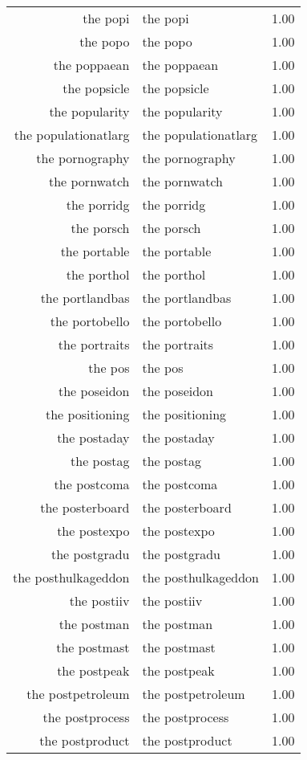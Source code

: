 \begin{table}[ht]
\begin{tabular}{rlr}
  the popi & the popi & 1.00 \\ 
  the popo & the popo & 1.00 \\ 
  the poppaean & the poppaean & 1.00 \\ 
  the popsicle & the popsicle & 1.00 \\ 
  the popularity & the popularity & 1.00 \\ 
  the populationatlarg & the populationatlarg & 1.00 \\ 
  the pornography & the pornography & 1.00 \\ 
  the pornwatch & the pornwatch & 1.00 \\ 
  the porridg & the porridg & 1.00 \\ 
  the porsch & the porsch & 1.00 \\ 
  the portable & the portable & 1.00 \\ 
  the porthol & the porthol & 1.00 \\ 
  the portlandbas & the portlandbas & 1.00 \\ 
  the portobello & the portobello & 1.00 \\ 
  the portraits & the portraits & 1.00 \\ 
  the pos & the pos & 1.00 \\ 
  the poseidon & the poseidon & 1.00 \\ 
  the positioning & the positioning & 1.00 \\ 
  the postaday & the postaday & 1.00 \\ 
  the postag & the postag & 1.00 \\ 
  the postcoma & the postcoma & 1.00 \\ 
  the posterboard & the posterboard & 1.00 \\ 
  the postexpo & the postexpo & 1.00 \\ 
  the postgradu & the postgradu & 1.00 \\ 
  the posthulkageddon & the posthulkageddon & 1.00 \\ 
  the postiiv & the postiiv & 1.00 \\ 
  the postman & the postman & 1.00 \\ 
  the postmast & the postmast & 1.00 \\ 
  the postpeak & the postpeak & 1.00 \\ 
  the postpetroleum & the postpetroleum & 1.00 \\ 
  the postprocess & the postprocess & 1.00 \\ 
  the postproduct & the postproduct & 1.00 \\ 

\end{tabular}
\end{table}
